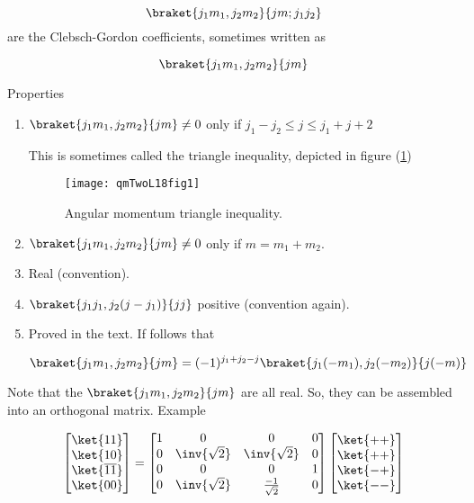 \begin{equation}\label{eqn:qmTwoL18:210}
\braket{ j_1 m_1, j_2 m_2}{jm ; j_1 j_2} 
\end{equation}
are the Clebsch-Gordon coefficients, sometimes written as 

\begin{equation}\label{eqn:qmTwoL18:230}
\braket{ j_1 m_1, j_2 m_2 }{ jm }
\end{equation}

Properties
\begin{enumerate}
\item $\braket{ j_1 m_1, j_2 m_2 }{ jm } \ne 0$ only if $j_1 - j_2 \le j \le j_1 + j+2$

This is sometimes called the triangle inequality, depicted in figure (\ref{fig:qmTwoL18:qmTwoL18fig1})

\begin{figure}[htp]
   \centering
   \texttt{[image: qmTwoL18fig1]}
   \caption{Angular momentum triangle inequality.}\label{fig:qmTwoL18:qmTwoL18fig1}
\end{figure}

\item $\braket{ j_1 m_1, j_2 m_2 }{ jm } \ne 0$ only if $m = m_1 + m_2$.

\item Real (convention).

\item $\braket{ j_1 j_1, j_2 (j - j_1) }{ j j }$ positive (convention again).

\item Proved in the text.  If follows that 

\begin{equation}\label{eqn:qmTwoL18:250}
\braket{ j_1 m_1, j_2 m_2 }{ j m }
=
(-1)^{j_1 + j_2 - j}
\braket{ j_1 (-m_1), j_2 (-m_2) }{ j (-m) }
\end{equation}
\end{enumerate}

Note that the $\braket{ j_1 m_1, j_2 m_2 }{ j m }$ are all real.  So, they can be assembled into an orthogonal matrix.  Example

\begin{equation}\label{eqn:qmTwoL18:270}
\begin{bmatrix}
\ket{11} \\
\ket{10} \\
\ket{\overline{11}} \\
\ket{00}
\end{bmatrix}
=
\begin{bmatrix}
1 & 0 & 0 & 0 \\
0 & \inv{\sqrt{2}} & \inv{\sqrt{2}} & 0 \\
0 & 0 & 0 & 1 \\
0 & \inv{\sqrt{2}} & \frac{-1}{\sqrt{2}} & 0 \\
\end{bmatrix}
\begin{bmatrix}
\ket{++} \\
\ket{++} \\
\ket{-+} \\
\ket{--}
\end{bmatrix}
\end{equation}

